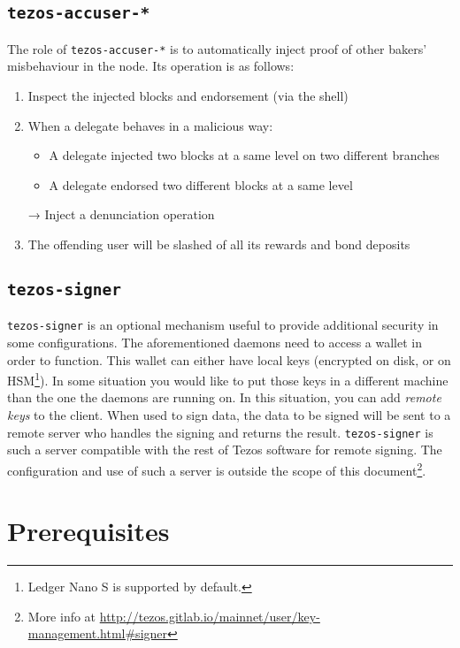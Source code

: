 \documentclass[a4paper,twocolumn,10pt]{article}
\begin{document}
\subsection{\texttt{tezos-accuser-*}}

The role of \texttt{tezos-accuser-*} is to automatically inject proof
of other bakers' misbehaviour in the node. Its operation is as
follows:

\begin{footnotesize}
\begin{enumerate}
\item Inspect the injected blocks and endorsement (via the shell)
\item When a delegate behaves in a malicious way:
  \begin{itemize}
    \item A delegate injected two blocks at a same level on two different branches
    \item A delegate endorsed two different blocks at a same level
  \end{itemize}
  → Inject a denunciation operation
\item The offending user will be slashed of all its rewards and bond
  deposits
\end{enumerate}
\end{footnotesize}

\subsection{\texttt{tezos-signer}}

\texttt{tezos-signer} is an optional mechanism useful to provide
additional security in some configurations. The aforementioned daemons
need to access a wallet in order to function. This wallet can either
have local keys (encrypted on disk, or on HSM\footnote{Ledger Nano S
  is supported by default.}). In some situation you would like to put
those keys in a different machine than the one the daemons are running
on. In this situation, you can add \emph{remote keys} to the
client. When used to sign data, the data to be signed will be sent to
a remote server who handles the signing and returns the
result. \texttt{tezos-signer} is such a server compatible with the
rest of Tezos software for remote signing. The configuration and use
of such a server is outside the scope of this document\footnote{More
  info at
  \url{http://tezos.gitlab.io/mainnet/user/key-management.html\#signer}}.

\section{Prerequisites}
\end{document}
